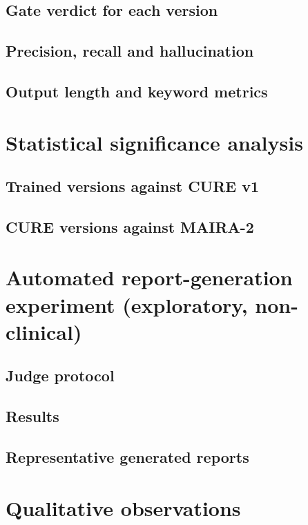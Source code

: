 \subsection{Gate verdict for each version}
\subsection{Precision, recall and hallucination}
\subsection{Output length and keyword metrics}

\section{Statistical significance analysis}\label{sec:significance}
\subsection{Trained versions against CURE v1}
\subsection{CURE versions against MAIRA-2}

\section{Automated report-generation experiment (exploratory, non-clinical)}\label{sec:report-check}
\subsection{Judge protocol}
\subsection{Results}
\subsection{Representative generated reports}

\section{Qualitative observations}
